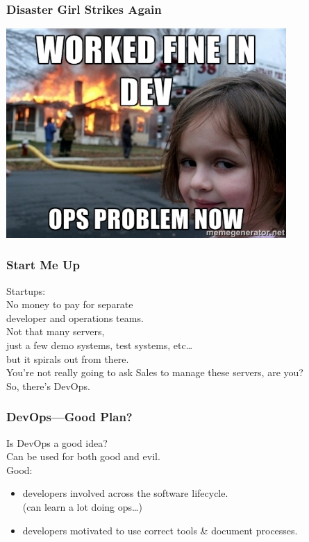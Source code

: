 \begin{frame}
\frametitle{Disaster Girl Strikes Again}

\begin{center}
	\includegraphics[width=0.8\textwidth]{images/devops.jpg}
\end{center}

\end{frame}



\begin{frame}
\frametitle{Start Me Up}

\Large
\begin{changemargin}{1cm}
Startups:\\[1em]
No money to pay for separate \\
developer and operations teams.\\[1em]
Not that many servers, \\
just a few demo systems, test systems, etc\ldots\\
but it spirals out from there. \\[1em]
You're not really going to ask Sales to manage these servers, are you? \\
So, there's DevOps. 
\end{changemargin}

\end{frame}



\begin{frame}
\frametitle{DevOps---Good Plan?}

\large
\begin{changemargin}{1cm}
Is DevOps a good idea? \\
Can be used for both good and evil. \\[1em]
Good:
\begin{itemize}
\item developers involved across the software lifecycle.\\
(can learn a lot doing ops\ldots )
\item developers motivated to use correct tools \& document processes.
\end{itemize}
\end{changemargin}

\end{frame}




